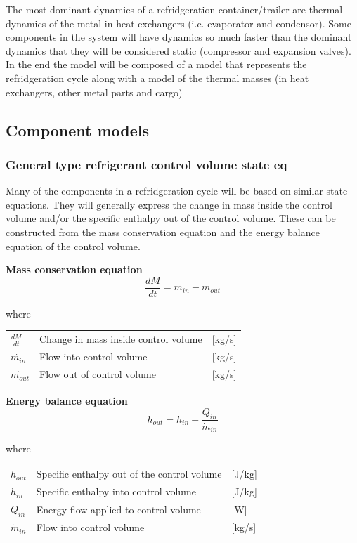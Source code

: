 The most dominant dynamics of a refridgeration container/trailer are thermal dynamics of the metal in heat exchangers (i.e. evaporator and condensor). Some components in the system will have dynamics so much faster than the dominant dynamics that they will be considered static (compressor and expansion valves).
In the end the model will be composed of a model that represents the refridgeration cycle along with a model of the thermal masses (in heat exchangers, other metal parts and cargo)


\subsection{Component models}

\subsubsection{General type refrigerant control volume state eq}
Many of the components in a refridgeration cycle will be based on similar state equations. They will generally express the change in mass inside the control volume and/or the specific enthalpy out of the control volume. These can be constructed from the mass conservation equation and the energy balance equation of the control volume.

\textbf{Mass conservation equation} \\
\begin{equation} \label{eq:GeneralTypeControlVol_MassConservation}
	\frac{dM}{dt} = \dot{m_{in}} - \dot{m_{out}}
\end{equation}

where 
\begin{center}
	\begin{tabular}{l p{8cm} l}
		$\frac{dM}{dt}$ 	& Change in mass inside control volume & [\si{kg}/\si{s}]\\ 
		$\dot{m_{in}}$ 		& Flow into control volume & [\si{kg}/\si{s}]\\
		$\dot{m_{out}}$ 	& Flow out of control volume & [\si{kg}/\si{s}]\\
	\end{tabular}
\end{center}

\textbf{Energy balance equation}
\begin{equation}
	h_{out} = h_{in} + \frac{Q_{in}}{\dot{m}_{in}}
\end{equation}

where
\begin{center}
	\begin{tabular}{l p{8cm} l}
		$h_{out}$ 		& Specific enthalpy out of the control volume & [\si{J}/\si{kg}]\\ 
		$h_{in}$ 		& Specific enthalpy into control volume & [\si{J}/\si{kg}]\\ 
		$Q_{in}$ 		& Energy flow applied to control volume& [\si{W}]\\
		$\dot{m}_{in}$ 	& Flow into control volume & [\si{kg}/\si{s}]\\
	\end{tabular}
\end{center}

